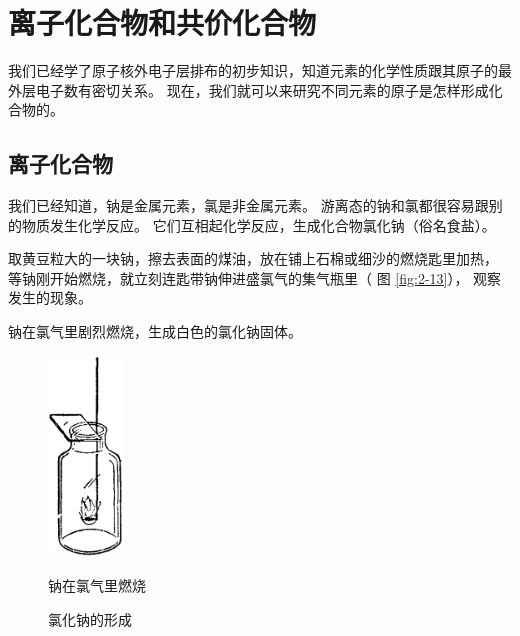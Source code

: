 \section{离子化合物和共价化合物}\label{sec:2-5}

我们已经学了原子核外电子层排布的初步知识，知道元素的化学性质跟其原子的最外层电子数有密切关系。
现在，我们就可以来研究不同元素的原子是怎样形成化合物的。

\subsection{离子化合物}


我们已经知道，钠是金属元素，氯是非金属元素。
游离态的钠和氯都很容易跟别的物质发生化学反应。
它们互相起化学反应，生成化合物氯化钠（俗名食盐）。

\begin{shiyan}
    取黄豆粒大的一块钠，擦去表面的煤油，放在铺上石棉或细沙的燃烧匙里加热，
    等钠刚开始燃烧，就立刻连匙带钠伸进盛氯气的集气瓶里（ 图 \ref{fig:2-13}），
    观察发生的现象。
\end{shiyan}

钠在氯气里剧烈燃烧，生成白色的氯化钠固体。

\begin{figure}[htbp]
    \centering
    \begin{minipage}[b]{7cm}
        \centering
        \includegraphics[width=2cm]{../pic/czhx1-ch2-13}
        \caption{钠在氯气里燃烧}\label{fig:2-13}
    \end{minipage}
    \qquad
    \begin{minipage}[b]{7cm}
        \centering
        
        \caption{氯化钠的形成}\label{fig:2-14}
    \end{minipage}
\end{figure}

